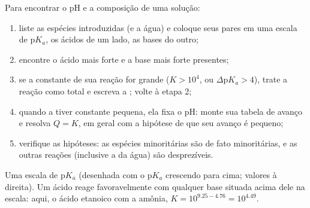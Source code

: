 \begin{method}\label{met:b1:predominant-reaction:method}
Para encontrar o pH e a composição de uma solução:
\begin{enumerate}
  \item liste as espécies introduzidas (e a água) e coloque seus pares em
        uma escala de $\mathrm{p}K_a$, os ácidos de um lado, as bases do
        outro;
  \item encontre o ácido mais forte e a base mais forte presentes;
  \item se a constante de sua reação for grande ($K > 10^4$, ou
        $\Delta\mathrm{p}K_a > 4$), trate a reação como total e escreva
        a ; volte à etapa 2;
  \item quando a  tiver constante pequena, ela fixa o
        pH: monte sua tabela de avanço e resolva $Q = K$, em geral com a
        hipótese de que seu avanço é pequeno;
  \item verifique as hipóteses: as espécies minoritárias são de fato
        minoritárias, e as outras reações (inclusive a  da
        água) são desprezíveis.
\end{enumerate}
\end{method}

\begin{omfigure}

{\small Uma escala de $\mathrm{p}K_a$ (desenhada com o p$K_a$ crescendo
para cima; valores à direita). Um ácido reage favoravelmente com
qualquer base situada acima dele na escala: aqui, o ácido etanoico com a
amônia, $K = 10^{9.25 - 4.76} = 10^{4.49}$.}
\end{omfigure}

